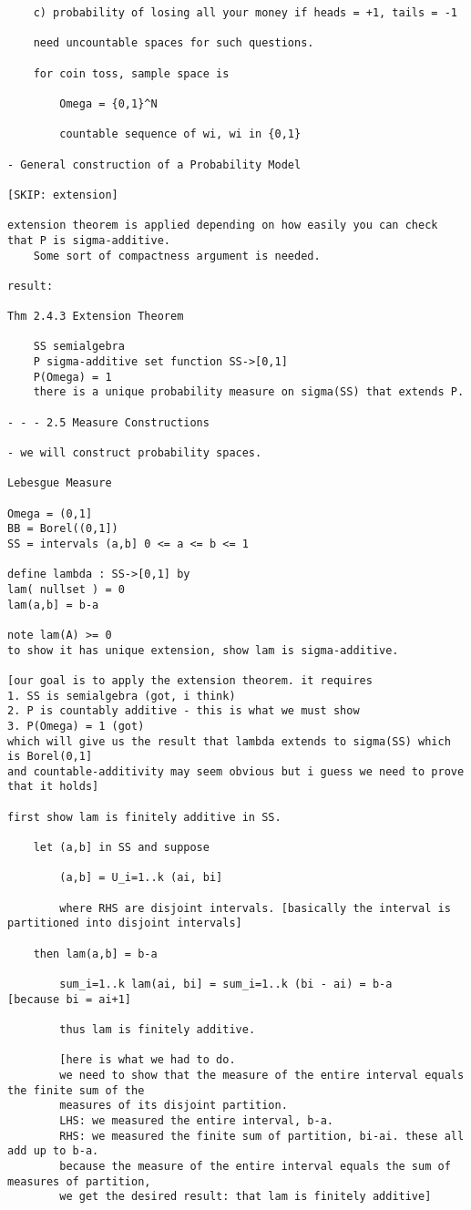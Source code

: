 \documentclass{article}
\begin{document}
\begin{flushleft}
\begin{verbatim}
	c) probability of losing all your money if heads = +1, tails = -1
	
	need uncountable spaces for such questions. 
	
	for coin toss, sample space is
		
		Omega = {0,1}^N
		
		countable sequence of wi, wi in {0,1}
		
- General construction of a Probability Model

[SKIP: extension]

extension theorem is applied depending on how easily you can check that P is sigma-additive. 
	Some sort of compactness argument is needed.
	
result:

Thm 2.4.3 Extension Theorem

	SS semialgebra
	P sigma-additive set function SS->[0,1] 
	P(Omega) = 1
	there is a unique probability measure on sigma(SS) that extends P. 

- - - 2.5 Measure Constructions

- we will construct probability spaces. 

Lebesgue Measure

Omega = (0,1]
BB = Borel((0,1])
SS = intervals (a,b] 0 <= a <= b <= 1

define lambda : SS->[0,1] by 
lam( nullset ) = 0
lam(a,b] = b-a

note lam(A) >= 0
to show it has unique extension, show lam is sigma-additive.

[our goal is to apply the extension theorem. it requires 
1. SS is semialgebra (got, i think)
2. P is countably additive - this is what we must show
3. P(Omega) = 1 (got)
which will give us the result that lambda extends to sigma(SS) which is Borel(0,1]
and countable-additivity may seem obvious but i guess we need to prove that it holds]

first show lam is finitely additive in SS.

	let (a,b] in SS and suppose
	
		(a,b] = U_i=1..k (ai, bi]
		
		where RHS are disjoint intervals. [basically the interval is partitioned into disjoint intervals]
		
	then lam(a,b] = b-a
	
		sum_i=1..k lam(ai, bi] = sum_i=1..k (bi - ai) = b-a    [because bi = ai+1]

		thus lam is finitely additive.
		
		[here is what we had to do.
		we need to show that the measure of the entire interval equals the finite sum of the 
		measures of its disjoint partition. 
		LHS: we measured the entire interval, b-a.
		RHS: we measured the finite sum of partition, bi-ai. these all add up to b-a.
		because the measure of the entire interval equals the sum of measures of partition, 
		we get the desired result: that lam is finitely additive]
	

\end{verbatim}
\end{flushleft}
\end{document}
